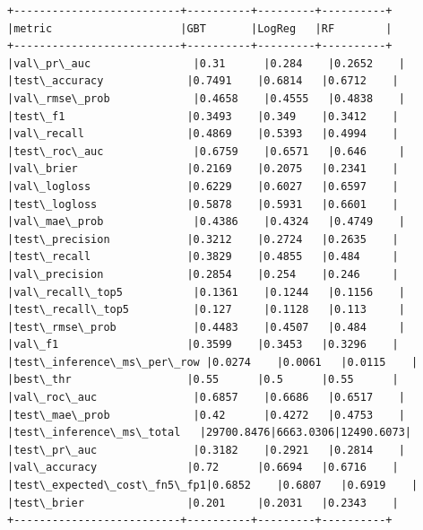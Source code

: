 \documentclass[11pt]{article}
\makeatletter
\newcommand{\boxspacing}{\kern\kvtcb@left@rule\kern\kvtcb@boxsep}
\newcommand{\prompt}[4]{
        {\ttfamily\llap{{\color{#2}[#3]:\hspace{3pt}#4}}\vspace{-\baselineskip}}
    }
\makeatother
\begin{document}
    \begin{Verbatim}[commandchars=\\\{\}]
+--------------------------+----------+---------+----------+
|metric                    |GBT       |LogReg   |RF        |
+--------------------------+----------+---------+----------+
|val\_pr\_auc                |0.31      |0.284    |0.2652    |
|test\_accuracy             |0.7491    |0.6814   |0.6712    |
|val\_rmse\_prob             |0.4658    |0.4555   |0.4838    |
|test\_f1                   |0.3493    |0.349    |0.3412    |
|val\_recall                |0.4869    |0.5393   |0.4994    |
|test\_roc\_auc              |0.6759    |0.6571   |0.646     |
|val\_brier                 |0.2169    |0.2075   |0.2341    |
|val\_logloss               |0.6229    |0.6027   |0.6597    |
|test\_logloss              |0.5878    |0.5931   |0.6601    |
|val\_mae\_prob              |0.4386    |0.4324   |0.4749    |
|test\_precision            |0.3212    |0.2724   |0.2635    |
|test\_recall               |0.3829    |0.4855   |0.484     |
|val\_precision             |0.2854    |0.254    |0.246     |
|val\_recall\_top5           |0.1361    |0.1244   |0.1156    |
|test\_recall\_top5          |0.127     |0.1128   |0.113     |
|test\_rmse\_prob            |0.4483    |0.4507   |0.484     |
|val\_f1                    |0.3599    |0.3453   |0.3296    |
|test\_inference\_ms\_per\_row |0.0274    |0.0061   |0.0115    |
|best\_thr                  |0.55      |0.5      |0.55      |
|val\_roc\_auc               |0.6857    |0.6686   |0.6517    |
|test\_mae\_prob             |0.42      |0.4272   |0.4753    |
|test\_inference\_ms\_total   |29700.8476|6663.0306|12490.6073|
|test\_pr\_auc               |0.3182    |0.2921   |0.2814    |
|val\_accuracy              |0.72      |0.6694   |0.6716    |
|test\_expected\_cost\_fn5\_fp1|0.6852    |0.6807   |0.6919    |
|test\_brier                |0.201     |0.2031   |0.2343    |
+--------------------------+----------+---------+----------+

    \end{Verbatim}

    \begin{Verbatim}[commandchars=\\\{\}]

    \end{Verbatim}

    \begin{tcolorbox}[breakable, size=fbox, boxrule=1pt, pad at break*=1mm,colback=cellbackground, colframe=cellborder]
\prompt{In}{incolor}{ }{\boxspacing}
\begin{Verbatim}[commandchars=\\\{\}]

\end{Verbatim}
\end{tcolorbox}
\end{document}
